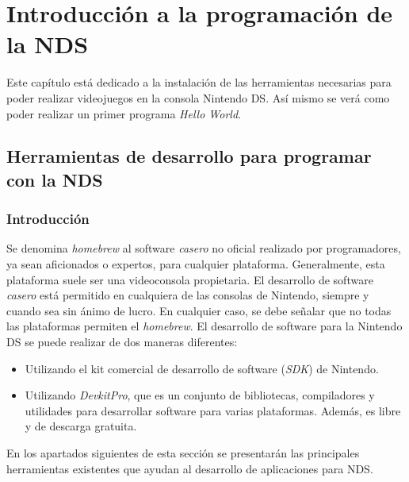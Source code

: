 \chapter{Introducción a la programación de la NDS}

Este capítulo está dedicado a la instalación de las herramientas necesarias para poder realizar videojuegos en la consola Nintendo DS. Así mismo se verá como poder realizar un primer programa \textit{Hello World}.

\section{Herramientas de desarrollo para programar con la NDS}

\subsection{Introducción}
Se denomina \textit{homebrew} al software \textit{casero} no oficial realizado por programadores, ya sean aficionados o expertos, para cualquier plataforma. Generalmente, esta plataforma suele ser una videoconsola pro\-pie\-taria. El desarrollo de software \textit{casero} está permitido en cualquiera de las consolas de Nintendo, siempre y cuando sea sin ánimo de lucro. En cualquier caso, se debe señalar que no todas las plataformas permiten el \textit{homebrew}. El desarrollo de software para la Nintendo DS se puede realizar de dos maneras diferentes:

\begin{itemize}
\item Utilizando el kit comercial de desarrollo de software (\textit{SDK}) de Nintendo.
\item Utilizando \textit{DevkitPro}, que es un conjunto de bibliotecas, compiladores y utilidades para desarrollar software para varias plataformas. Además, es libre y de descarga gratuita.
\end{itemize}

En los apartados siguientes de esta sección se presentarán las principales herramientas existentes que ayudan al desarrollo de aplicaciones para NDS.

